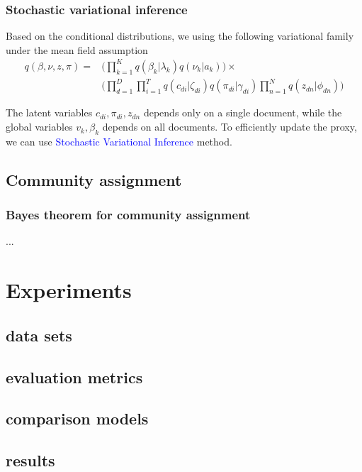 \documentclass{beamer}
\begin{document}
\begin{frame}
\frametitle{Stochastic variational inference}
Based on the conditional distributions, we using the following variational family under the mean field assumption
\begin{align*}
q(\beta,\nu,z,\pi)  = & \Big(\prod_{k=1}^{K}q(\beta_k|\lambda_k)q(\nu_k|a_k)\Big)\times\\
&\Big(\prod_{d=1}^{D}\prod_{i=1}^{T}q(c_{di}|\zeta_{di})q(\pi_{di}|\gamma_{di})\prod_{n=1}^{N}q(z_{dn}|\phi_{dn})\Big)
\end{align*}

The latent variables $c_{di}, \pi_{di}, z_{dn}$ depends only on a single document, while the global variables $v_k, \beta_k$ depends on all documents. To efficiently update the proxy, we can use \textcolor{blue}{Stochastic Variational Inference} method.
\end{frame}

\subsection{Community assignment}
\begin{frame}
\frametitle{Bayes theorem for community assignment}
...
\end{frame}

\section{Experiments}
\subsection{data sets}
\subsection{evaluation metrics}
\subsection{comparison models}
\subsection{results}
\end{document}
